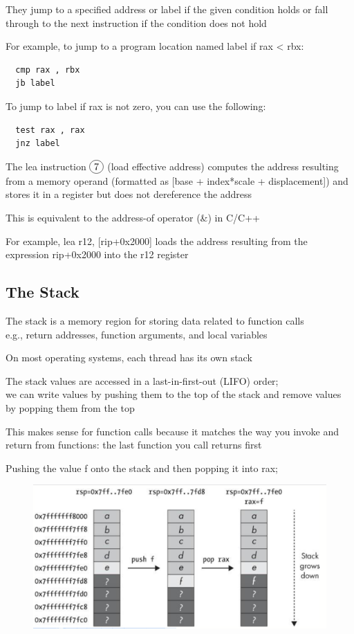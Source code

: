 \documentclass[]{project_plan}
\newcommand*\circled[1]{\tikz[baseline=(char.base)]{
            \node[shape=circle,draw,inner sep=2pt] (char) {#1};}}
\begin{document}
They jump to a specified address or label if the given condition holds or fall through to the next instruction if
the condition does not hold

For example, to jump to a program location named label if rax < rbx:
\begin{lstlisting}
  cmp rax , rbx
  jb label
\end{lstlisting}

To jump to label if rax is not zero, you can use the following:
\begin{lstlisting}
  test rax , rax
  jnz label
\end{lstlisting}

The lea instruction $\circled{7}$ (load effective address) computes the address resulting from a memory
operand (formatted as [base + index*scale + displacement]) and stores it in a register but does not
dereference the address

This is equivalent to the address-of operator (\&) in C/C++

For example, lea r12, [rip+0x2000] loads the address resulting from the expression
rip+0x2000 into the r12 register

\subsection{The Stack}

The stack is a memory region for storing data related to function calls\\
e.g., return addresses, function arguments, and local variables

On most operating systems, each thread has its own stack

The stack values are accessed in a last-in-first-out (LIFO) order;\\
we can write values by pushing them to the top of the stack and remove values by popping them from the
top

This makes sense for function calls because it matches the way you invoke and return from
functions: the last function you call returns first

Pushing the value f onto the stack and then popping it into rax;
\begin{figure}[H]
  \centering
  \includegraphics[width=.8\linewidth]{pushing_and_popping_stack.png}
\end{figure}
\end{document}
